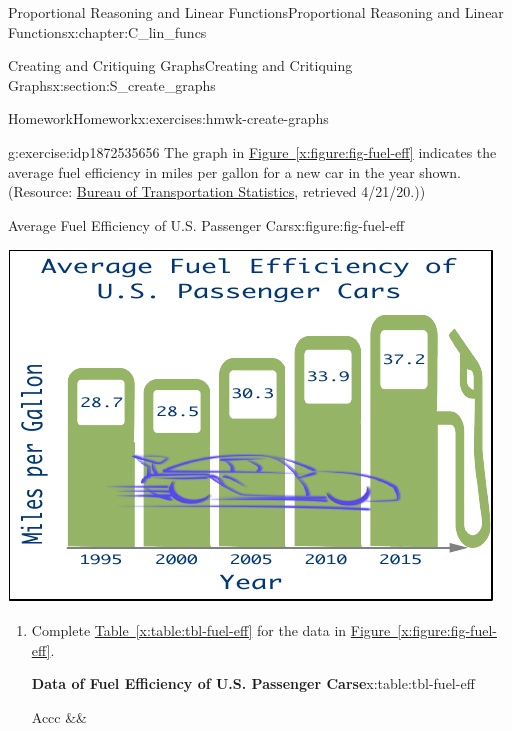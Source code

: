 \documentclass[oneside,10pt,]{book}
\newcommand{\tabularfont}{\relax}
\newcommand{\xreffont}{\relax}
\numberwithin{equation}{chapter}
\newcommand{\hrulethin}  {\noalign{\hrule height 0.04em}}
\begin{document}
\begin{chapterptx}{Proportional Reasoning and Linear Functions}{}{Proportional Reasoning and Linear Functions}{}{}{x:chapter:C_lin_funcs}
\begin{sectionptx}{Creating and Critiquing Graphs}{}{Creating and Critiquing Graphs}{}{}{x:section:S_create_graphs}
\begin{exercises-subsection}{Homework}{}{Homework}{}{}{x:exercises:hmwk-create-graphs}
%
\begin{divisionexercise}{4}{}{}{g:exercise:idp1872535656}%
The graph in \hyperref[x:figure:fig-fuel-eff]{Figure~{\xreffont\ref{x:figure:fig-fuel-eff}}} indicates the average fuel efficiency in miles per gallon for a new car in the year shown. (Resource: \href{https://www.bts.gov/content/average-fuel-efficiency-us-passenger-cars-and-light-trucks}{Bureau of Transportation Statistics}\footnotemark{}, retrieved 4\slash{}21\slash{}20.))%
\begin{figureptx}{Average Fuel Efficiency of U.S. Passenger Cars}{x:figure:fig-fuel-eff}{}%
\begin{image}{0.15}{0.7}{0.15}%
\includegraphics[width=\linewidth]{external/fuel-eff.pdf}
\end{image}%
\tcblower
\end{figureptx}%
\begin{enumerate}[font=\bfseries,label=(\alph*),ref=\alph*]
\item\label{x:task:exer-fuel-a}Complete \hyperref[x:table:tbl-fuel-eff]{Table~{\xreffont\ref{x:table:tbl-fuel-eff}}} for the data in \hyperref[x:figure:fig-fuel-eff]{Figure~{\xreffont\ref{x:figure:fig-fuel-eff}}}.%
\begin{tableptx}{\textbf{Data of Fuel Efficiency of U.S. Passenger Carse}}{x:table:tbl-fuel-eff}{}%
\centering%
{\tabularfont%
\begin{tabular}{Accc}\hrulethin
{}&&\tabularnewline\hrulethin

\end{tabular}}
\end{tableptx}
\end{enumerate}
\end{divisionexercise}
\end{exercises-subsection}
\end{sectionptx}
\end{chapterptx}
\end{document}
